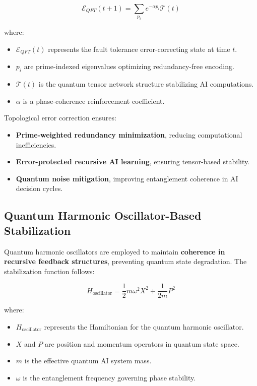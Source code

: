 \documentclass{article}
\theoremstyle{plain}
\begin{document}
\begin{equation}
    \mathcal{E}_{QFT}(t+1) = \sum_{p_i} e^{- \alpha p_i} \mathcal{T}(t)
\end{equation}

where:
\begin{itemize}
    \item \( \mathcal{E}_{QFT}(t) \) represents the fault tolerance error-correcting state at time \( t \).
    \item \( p_i \) are prime-indexed eigenvalues optimizing redundancy-free encoding.
    \item \( \mathcal{T}(t) \) is the quantum tensor network structure stabilizing AI computations.
    \item \( \alpha \) is a phase-coherence reinforcement coefficient.
\end{itemize}

Topological error correction ensures:
\begin{itemize}
    \item \textbf{Prime-weighted redundancy minimization}, reducing computational inefficiencies.
    \item \textbf{Error-protected recursive AI learning}, ensuring tensor-based stability.
    \item \textbf{Quantum noise mitigation}, improving entanglement coherence in AI decision cycles.
\end{itemize}

\subsection{Quantum Harmonic Oscillator-Based Stabilization}

Quantum harmonic oscillators are employed to maintain \textbf{coherence in recursive feedback structures}, preventing quantum state degradation. The stabilization function follows:

\begin{equation}
    H_{\text{oscillator}} = \frac{1}{2}m \omega^2 X^2 + \frac{1}{2m} P^2
\end{equation}

where:
\begin{itemize}
    \item \( H_{\text{oscillator}} \) represents the Hamiltonian for the quantum harmonic oscillator.
    \item \( X \) and \( P \) are position and momentum operators in quantum state space.
    \item \( m \) is the effective quantum AI system mass.
    \item \( \omega \) is the entanglement frequency governing phase stability.
\end{itemize}
\end{document}
